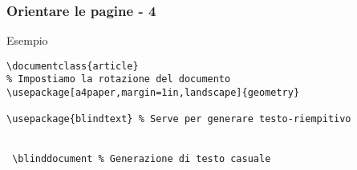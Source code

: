 \begin{frame}[fragile]
 \frametitle{Orientare le pagine - 4}
 
 \begin{exampleblock}{Esempio}
  \begin{lstlisting}[frame = single, title={Ruotare un documento}] 
\documentclass{article}
% Impostiamo la rotazione del documento
\usepackage[a4paper,margin=1in,landscape]{geometry}

\usepackage{blindtext} % Serve per generare testo-riempitivo


 \blinddocument % Generazione di testo casuale

\end{lstlisting}
 \end{exampleblock}
\end{frame}
